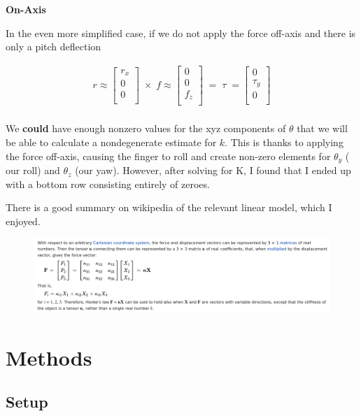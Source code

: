 \documentclass[12pt]{article}
\begin{document}
\textbf{On-Axis}

In the even more simplified case, if we do not apply the force off-axis and there is only a pitch
deflection

\begin{align}
r \approx
\begin{bmatrix}
    r_x       \\
    0       \\
    0       \\
\end{bmatrix} \; \times \;
f \approx
\begin{bmatrix}
    0       \\
    0       \\
    f_z      \\
\end{bmatrix} \; =  \; \tau \; = 
\begin{bmatrix}
    0 \\
    \tau_y       \\
    0      \\
\end{bmatrix}\\
\end{align}

We \textbf{could} have enough nonzero values for the xyz components of $\theta$ that we will be able
to calculate a nondegenerate estimate for $k$. This is thanks to applying the force off-axis,
causing the finger to roll and create non-zero elements for $\theta_y$ ( our roll) and $\theta_z$
(our yaw). However, after solving for K, I found that I ended up with a bottom row consisting
entirely of zeroes.

There is a good summary on wikipedia of the relevant linear model, which I enjoyed.

\begin{figure}[H]
\centering
\includegraphics[width=.5\textwidth]{images/misc/stiffness_tensor.png}
\end{figure}

\section{Methods}

\subsection{Setup}
\end{document}
